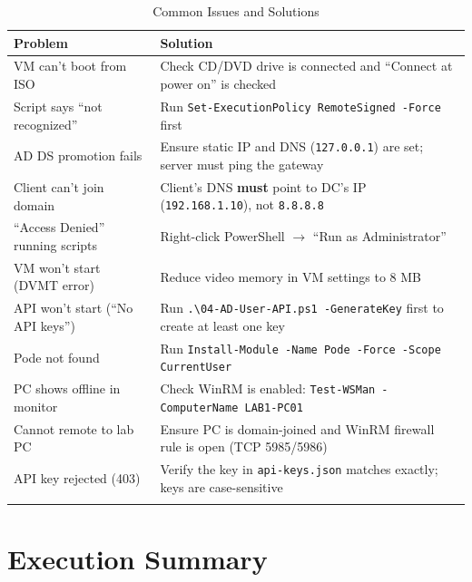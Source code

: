 ﻿\documentclass[12pt,a4paper]{article}
\begin{document}
\begin{longtable}{p{5cm} p{9.5cm}}
\toprule
\textbf{Problem} & \textbf{Solution} \\
\midrule
\endhead
VM can't boot from ISO & Check CD/DVD drive is connected and ``Connect at power on'' is checked \\[4pt]
Script says ``not recognized'' & Run \texttt{Set-ExecutionPolicy RemoteSigned -Force} first \\[4pt]
AD DS promotion fails & Ensure static IP and DNS (\texttt{127.0.0.1}) are set; server must ping the gateway \\[4pt]
Client can't join domain & Client's DNS \textbf{must} point to DC's IP (\texttt{192.168.1.10}), not \texttt{8.8.8.8} \\[4pt]
``Access Denied'' running scripts & Right-click PowerShell $\rightarrow$ ``Run as Administrator'' \\[4pt]
VM won't start (DVMT error) & Reduce video memory in VM settings to 8 MB \\[4pt]
API won't start (``No API keys'') & Run \texttt{.\textbackslash 04-AD-User-API.ps1 -GenerateKey} first to create at least one key \\[4pt]
Pode not found & Run \texttt{Install-Module -Name Pode -Force -Scope CurrentUser} \\[4pt]
PC shows offline in monitor & Check WinRM is enabled: \texttt{Test-WSMan -ComputerName LAB1-PC01} \\[4pt]
Cannot remote to lab PC & Ensure PC is domain-joined and WinRM firewall rule is open (TCP 5985/5986) \\[4pt]
API key rejected (403) & Verify the key in \texttt{api-keys.json} matches exactly; keys are case-sensitive \\
\bottomrule
\caption{Common Issues and Solutions}
\end{longtable}

\section{Execution Summary}
\end{document}
